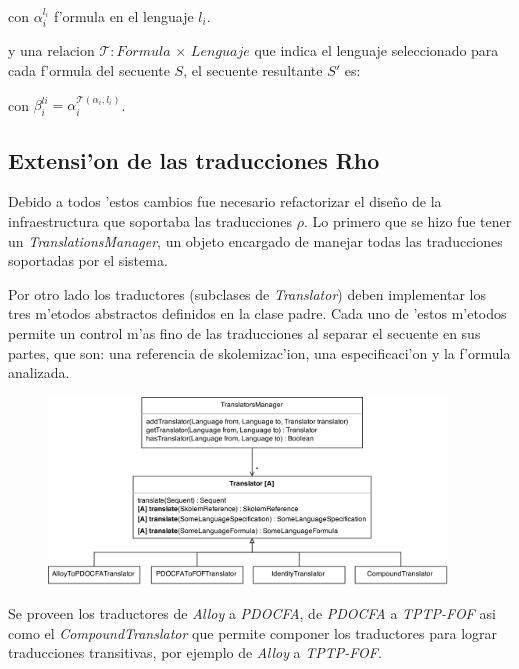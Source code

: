 con $\alpha_{i}^{l_i}$ f'ormula en el lenguaje $l_i$.

y una relacion $\mathcal{T}:Formula$ $\times$ $Lenguaje$ que indica el lenguaje seleccionado para cada f'ormula del secuente $S$, el secuente resultante $S'$ es:

\begin{prooftree}
\end{prooftree}

con $\beta_{i}^{li} = \alpha_i^{\mathcal{T}(\alpha_i, l_i)}$.


\subsection{Extensi'on de las traducciones Rho}

Debido a todos 'estos cambios fue necesario refactorizar el diseño de la infraestructura que soportaba las traducciones $\rho$. Lo primero que se hizo fue tener un \textit{TranslationsManager}, un objeto encargado de manejar todas las traducciones soportadas por el sistema. 

Por otro lado los traductores (subclases de \textit{Translator}) deben implementar los tres m'etodos  abstractos definidos en la clase padre. Cada uno de 'estos m'etodos permite un control m'as fino de las traducciones al separar el secuente en sus partes, que son: una referencia de skolemizac'ion, una especificaci'on y la f'ormula analizada.

\begin{figure}[H]
	\includegraphics[width=400px]{img/arq_traductores.png}
\end{figure}

Se proveen los traductores de \textit{Alloy} a \textit{PDOCFA}, de \textit{PDOCFA} a \textit{TPTP-FOF} asi como el \textit{CompoundTranslator} que permite componer los traductores para lograr traducciones transitivas, por ejemplo de \textit{Alloy} a \textit{TPTP-FOF}.